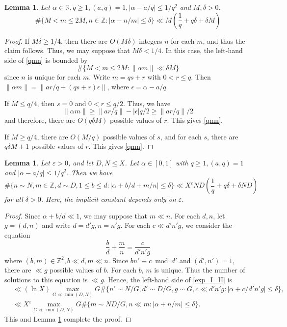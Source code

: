 \documentclass[10pt,a4paper]{amsart}
\newtheorem{lem}[dfn]{Lemma}
\newcommand{\1}{
    \bm{1}
}
\begin{document}
\begin{lem}\label{bohr}
Let $\alpha \in \mathbb{R}, q \geq 1, (a,q)=1, |\alpha-a/q| \leq 1/q^2$ and $M,\delta>0$. 
\begin{equation} \#\{ M<m \leq 2M,n \in \mathbb{Z} : |\alpha - n/m| \leq \delta \} \ll M \left( \frac{1}{q} + q \delta + \delta M \right)  \label{qmn} \end{equation}
\end{lem}
\begin{proof}
If $M \delta \geq 1/4$, then there are $O(M\delta)$ integers $n$ for each $m$, and thus the claim follows. Thus, we may suppose that $M \delta < 1/4$. In this case, the left-hand side of \eqref{qmn} is bounded by
\[ \#\{ M<m \leq 2M : \| \alpha m\| \ll \delta M \} \]
since $n$ is unique for each $m$. Write $m=qs+r$ with $0< r \leq q$. Then $\|\alpha m\| =\|ar/q+(qs+r) \epsilon \|$, where $\epsilon=\alpha-a/q$.  

If $M \leq q/4$, then $s=0$ and $0<r\leq q/2$. Thus, we have
\[ \|\alpha m\| \geq \|ar/q\|-|\epsilon| q/2 \geq \|ar/q\|/2 \]
and therefore, there are $O(q \delta M)$ possible values of $r$. This gives \eqref{qmn}. 

If $M \geq q/4$, there are $O(M/q)$ possible values of $s$, and for each $s$, there are $q \delta M+1$ possible values of $r$. This gives \eqref{qmn}. 
\end{proof}




\begin{lem}\label{bohr_dn}
Let $\varepsilon>0$, and let $D,N \leq X$. Let $\alpha \in [0,1]$ with $q \geq 1, (a,q)=1$ and $|\alpha-a/q| \leq 1/q^2$. Then we have
\begin{equation} \label{exp_I_II} \#\{n \sim N, m \in \mathbb{Z},d \sim D, 1 \leq b \leq d : |\alpha+b/d + m/n| \leq \delta \} \ll X^{\varepsilon} ND \left( \frac{1}{q} + q \delta + \delta ND \right) \end{equation}
for all $\delta>0$. Here, the implicit constant depends only on $\varepsilon$. 
\end{lem}

\begin{proof}
Since $\alpha+b/d \ll 1$, we may suppose that $m \ll n$. 
For each $d,n$, let $g=(d,n)$ and write $d=d'g, n=n'g$. For each $c \ll d'n'g$, we consider the equation
\[ \frac{b}{d} + \frac{m}{n} = \frac{c}{d'n'g} \]
where $(b,m) \in \mathbb{Z}^2, b \ll d, m \ll n$. Since $bn' \equiv c \bmod d'$ and $(d',n')=1$, there are $\ll g$ possible values of $b$. For each $b$, $m$ is unique. Thus the number of solutions to this equation is $\ll g$. Hence, the left-hand side of \eqref{exp_I_II} is
\begin{align*}
&\ll (\ln{X}) \max_{G \ll \min(D,N)} G \#\{n' \sim N/G, d' \sim D/G, g \sim G, c \ll d'n'g : |\alpha+c/d'n'g| \leq \delta \}, \\
&\ll X^{\varepsilon} \max_{G \ll \min(D,N)} G \#\{m \sim ND/G, n \ll m : |\alpha+n/m| \leq \delta \}. 
\end{align*}
This and Lemma \ref{bohr} complete the proof. 
\end{proof}
\end{document}

